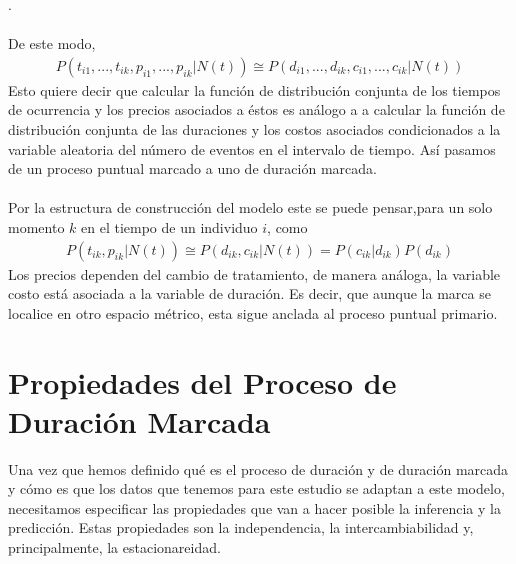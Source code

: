 .\\
\\
De este modo,
\begin{align}
P(t_{i1},...,t_{ik},p_{i1},...,p_{ik}|N(t)) \cong P(d_{i1},...,d_{ik},c_{i1},...,c_{ik}|N(t))
\end{align}
Esto quiere decir que calcular la funci\'on de distribuci\'on conjunta de los tiempos de ocurrencia y los precios asociados a \'estos es an\'alogo a a calcular la funci\'on de distribuci\'on conjunta de las duraciones y los costos asociados condicionados a la variable aleatoria del n\'umero de eventos en el intervalo de tiempo. As\'i pasamos de un proceso puntual marcado a uno de duraci\'on marcada.\\
\\
Por la estructura de construcci\'on del modelo este se puede pensar,para un solo momento $k$ en el tiempo de un individuo $i$, como
\begin{align}
P(t_{ik},p_{ik}|N(t))\cong P(d_{ik},c_{ik}|N(t)) = P(c_{ik}|d_{ik})P(d_{ik})
\end{align}
Los precios dependen del cambio de tratamiento, de manera an\'aloga, la variable costo est\'a asociada a la variable de duraci\'on. Es decir, que aunque la marca se localice en otro espacio m\'etrico, esta sigue anclada al proceso puntual primario.

\section{Propiedades del Proceso de Duraci\'on Marcada}
Una vez que hemos definido qu\'e es el proceso de duraci\'on y de duraci\'on marcada y c\'omo es que los datos que tenemos para este estudio se adaptan a este modelo, necesitamos especificar las propiedades que van a hacer posible la inferencia y la predicci\'on. Estas propiedades son la independencia, la intercambiabilidad y, principalmente, la estacionareidad.
